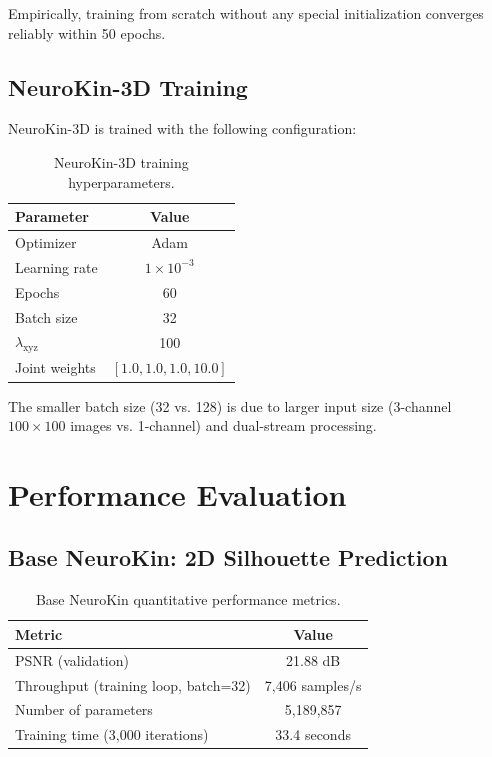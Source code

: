 \documentclass[12pt,a4paper,oneside]{report}
\begin{document}
Empirically, training from scratch without any special initialization converges reliably within 50 epochs.

\subsection{NeuroKin-3D Training}

NeuroKin-3D is trained with the following configuration:

\begin{table}[H]
\centering
\caption{NeuroKin-3D training hyperparameters.}
\label{tab:neurokin3d_hyperparams}
\begin{tabular}{lc}
\toprule
Parameter & Value \\
\midrule
Optimizer & Adam \\
Learning rate & $1 \times 10^{-3}$ \\
Epochs & 60 \\
Batch size & 32 \\
$\lambda_{\text{xyz}}$ & 100 \\
Joint weights & $[1.0, 1.0, 1.0, 10.0]$ \\
\bottomrule
\end{tabular}
\end{table}

The smaller batch size (32 vs. 128) is due to larger input size (3-channel $100 \times 100$ images vs. 1-channel) and dual-stream processing.

\section{Performance Evaluation}

\subsection{Base NeuroKin: 2D Silhouette Prediction}

\begin{table}[H]
\centering
\caption{Base NeuroKin quantitative performance metrics.}
\label{tab:neurokin_performance}
\begin{tabular}{lc}
\toprule
Metric & Value \\
\midrule
PSNR (validation) & 21.88 dB \\
Throughput (training loop, batch=32) & 7,406 samples/s \\
Number of parameters & 5,189,857 \\
Training time (3,000 iterations) & 33.4 seconds \\
\bottomrule
\end{tabular}
\end{table}
\end{document}
